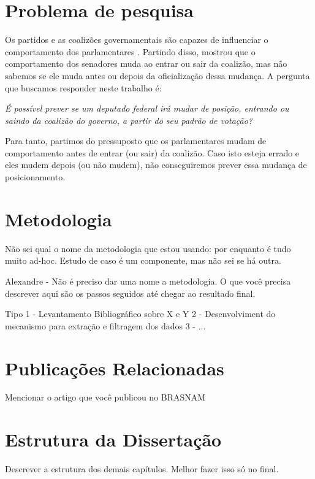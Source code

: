 \section{Problema de pesquisa}

Os partidos e as coalizões governamentais são capazes de influenciar o
comportamento dos parlamentares \cite{Figueiredo2001,Santos2003}. Partindo
disso,  mostrou que o comportamento dos senadores muda ao
entrar ou sair da coalizão, mas não sabemos se ele muda antes ou depois da
oficialização dessa mudança. A pergunta que buscamos responder neste trabalho
é:

\emph{É possível prever se um deputado federal irá mudar de posição, entrando
ou saindo da coalizão do governo, a partir do seu padrão de votação?}

Para tanto, partimos do pressuposto que os parlamentares mudam de comportamento
antes de entrar (ou sair) da coalizão. Caso isto esteja errado e eles mudem
depois (ou não mudem), não conseguiremos prever essa mudança de posicionamento.

\section{Metodologia}

Não sei qual o nome da metodologia que estou usando: por enquanto é tudo muito ad-hoc. Estudo de caso é um componente, mas não sei se há outra.

Alexandre -  Não é preciso dar uma nome a metodologia. O que você precisa descrever aqui são os passos seguidos até chegar ao resultado final.

Tipo
1 - Levantamento Bibliográfico sobre X e Y
2 - Desenvolviment do mecanismo para extração e filtragem dos dados
3 - ...

\section{Publicações Relacionadas}

Mencionar o artigo que você publicou no BRASNAM

\section{Estrutura da Dissertação}

Descrever a estrutura dos demais capítulos. Melhor fazer isso só no final.
